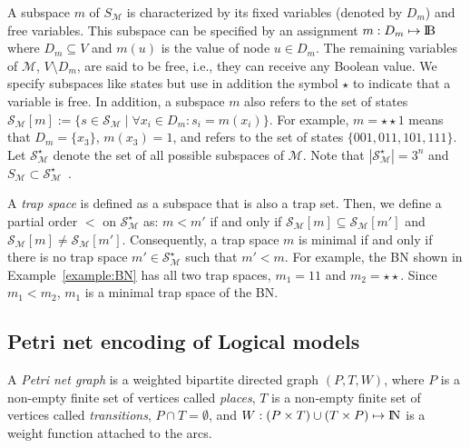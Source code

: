 \documentclass[runningheads]{llncs}
\newcommand{\bbbb}{{\rm I\!B}}
\begin{document}
A subspace \(m\) of \(S_{\mathcal{M}}\) is characterized by its fixed variables (denoted by \(D_m\)) and free variables. This subspace can be specified by an assignment \(m : D_m \mapsto \bbbb\) where \(D_m \subseteq V\) and \(m(u)\) is the value of node \(u \in D_m\). The remaining variables of \(\mathcal{M}\), \(V \setminus D_m\), are said to be free, i.e., they can receive any Boolean value. We specify subspaces like states but use in addition the symbol \(\star\) to indicate that a variable is free. In addition, a subspace \(m\) also refers to the set of states \(\mathcal{S}_{\mathcal{M}}[m] := \{s \in \mathcal{S}_{\mathcal{M}}\;|\;\forall x_i \in D_m : s_i = m(x_i)\}\). For example, \(m = \star\star1\) means that \(D_m = \{x_3\}\), \(m(x_3) = 1\), and refers to the set of states \(\{001, 011, 101, 111\}\). Let \(\mathcal{S}_{\mathcal{M}}^{\star}\) denote the set of all possible subspaces of \(\mathcal{M}\). Note that \(\left|\mathcal{S}_{\mathcal{M}}^{\star}\right| = 3^n\) and \(S_{\mathcal{M}} \subset \mathcal{S}_{\mathcal{M}}^{\star}\)~\cite{klarner2015computing}.

A \emph{trap space} is defined as a subspace that is also a trap set. Then, we define a partial order \(<\) on \(\mathcal{S}_{\mathcal{M}}^{\star}\) as: \(m < m'\) if and only if \(\mathcal{S}_{\mathcal{M}}[m] \subseteq \mathcal{S}_{\mathcal{M}}[m']\) and \(\mathcal{S}_{\mathcal{M}}[m] \neq \mathcal{S}_{\mathcal{M}}[m']\). Consequently, a trap space \(m\) is minimal if and only if there is no trap space \(m' \in \mathcal{S}_{\mathcal{M}}^{\star}\) such that \(m' < m\). For example, the BN shown in Example~\ref{example:BN} has all two trap spaces, \(m_1 = 11\) and \(m_2 = \star\star\). Since \(m_1 < m_2\), \(m_1\) is a minimal trap space of the BN.

\subsection{Petri net encoding of Logical models}
\label{sec:encoding}

\begin{definition}

  A \emph{Petri net graph} is a weighted bipartite directed graph \((P, T, W)\),
  where \(P\) is a non-empty finite set of vertices called \emph{places},
  \(T\) is a non-empty finite set of vertices called \emph{transitions},
  \(P \cap T = \emptyset\),
  and \(W : (P \times T) \cup (T \times P) \mapsto {\rm I\!N} \) is a weight function attached to the arcs.

\end{definition}
\end{document}
